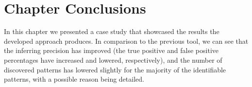 \section{Chapter Conclusions}
In this chapter we presented a case study that showcased the results the developed approach produces. In comparison to the previous tool, we can see that the inferring precision has improved (the true positive and false positive percentages have increased and lowered, respectively), and the number of discovered patterns has lowered slightly for the majority of the identifiable patterns, with a possible reason being detailed.